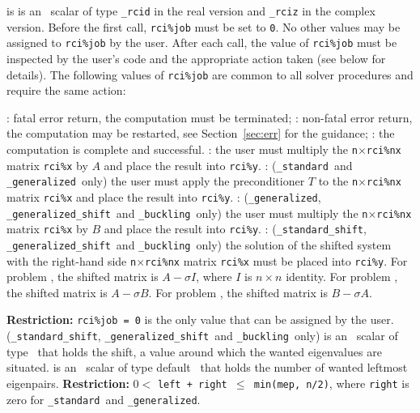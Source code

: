 \begin{description}
%
 is is an \intentinout\ scalar  of type
{\tt \solver\_rcid} in the real version and
{\tt \solver\_rciz} in the complex version.
Before the first call, {\tt rci\%job} must be set to {\tt 0}.
No other values may be assigned to {\tt rci\%job} by the user.
After each call,
the value of {\tt rci\%job} must be inspected by the user's code
and the appropriate action taken (see below for details).
The following values of {\tt rci\%job}
are common to all solver procedures 
and require the same action: 
%
\begin{description}
%
: fatal error return, the computation must be terminated;
%
: 
non-fatal error return, the computation may be restarted,
see Section~\ref{sec:err} for the guidance;
%
: the computation is complete and successful.
%
: 
the user must multiply the {\tt n}$\times${\tt rci\%nx} matrix
{\tt rci\%x} by $A$ and place the result into {\tt rci\%y}.
%
: 
({\tt\solver\_standard}\ and {\tt\solver\_generalized}\ only)
the user must
apply the preconditioner $T$ to the {\tt n}$\times${\tt rci\%nx} matrix
{\tt rci\%x} and place the result into {\tt rci\%y}.
%
: 
({\tt\solver\_generalized}, {\tt\solver\_generalized\_shift}\
and {\tt\solver\_buckling}\ only)
the user must multiply the {\tt n}$\times${\tt rci\%nx} matrix
{\tt rci\%x} by $B$ and place the result into {\tt rci\%y}.
%
:
({\tt\solver\_standard\_shift}, {\tt\solver\_generalized\_shift}\
and {\tt\solver\_buckling}\ only)
the solution of the shifted system
with the right-hand side {\tt n}$\times${\tt rci\%nx} matrix {\tt rci\%x}
must be placed into {\tt rci\%y}.
For problem \Ref{evp}, the shifted matrix is $A - \sigma I$,
where $I$ is $n\times n$ identity.
For problem \Ref{evp.g}, the shifted matrix is $A - \sigma B$.
For problem \Ref{evp.b}, the shifted matrix is $B - \sigma A$.
%
\end{description}
%
{\bf Restriction:} 
{\tt rci\%job = 0} is the only value that can be assigned by the user.
%
\itt{sigma} 
({\tt \solver\_standard\_shift}, {\tt \solver\_generalized\_shift}\
and {\tt \solver\_buckling}\ only)
is an \intentin\ scalar of type \REALDP\
that holds the shift, 
a value around which the wanted eigenvalues %
are situated.
%
\itt{left} is an \intentin\ scalar of type default \Integer\ 
that holds the number of wanted leftmost eigenpairs.
{\bf Restriction:} {$0 <$ \tt left + right $\le$ min(mep, n/2)},
where {\tt right} is zero for 
{\tt\solver\_standard}\ and {\tt\solver\_generalized}.

\end{description}

